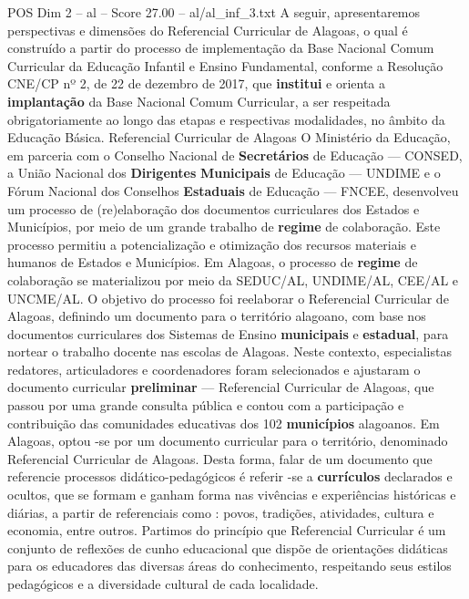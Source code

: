 \begin{textsample}{POS Dim 2 – al – Score 27.00 – al/al\_inf\_3.txt}  \label{ex:f2_pos_262}
A seguir, apresentaremos perspectivas e dimensões do Referencial Curricular de Alagoas, o qual é construído a partir do processo de implementação da Base Nacional Comum Curricular da Educação Infantil e Ensino Fundamental, conforme a Resolução CNE/CP nº 2, de 22 de dezembro de 2017, que \textbf{institui} e orienta a \textbf{implantação} da Base Nacional Comum Curricular, a ser respeitada obrigatoriamente ao longo das etapas e respectivas modalidades, no âmbito da Educação Básica.
Referencial Curricular de Alagoas O Ministério da Educação, em parceria com o Conselho Nacional de \textbf{Secretários} de Educação — CONSED, a União Nacional dos \textbf{Dirigentes} \textbf{Municipais} de Educação — UNDIME e o Fórum Nacional dos Conselhos \textbf{Estaduais} de Educação — FNCEE, desenvolveu um processo de (re)elaboração dos documentos curriculares dos Estados e Municípios, por meio de um grande trabalho de \textbf{regime} de colaboração.
Este processo permitiu a potencialização e otimização dos recursos materiais e humanos de Estados e Municípios.
Em Alagoas, o processo de \textbf{regime} de colaboração se materializou por meio da SEDUC/AL, UNDIME/AL, CEE/AL e UNCME/AL.
O objetivo do processo foi reelaborar o Referencial Curricular de Alagoas, definindo um documento para o território alagoano, com base nos documentos curriculares dos Sistemas de Ensino \textbf{municipais} e \textbf{estadual}, para nortear o trabalho docente nas escolas de Alagoas.
Neste contexto, especialistas redatores, articuladores e coordenadores foram selecionados e ajustaram o documento curricular \textbf{preliminar} — Referencial Curricular de Alagoas, que passou por uma grande consulta pública e contou com a participação e contribuição das comunidades educativas dos 102 \textbf{municípios} alagoanos.
Em Alagoas, optou -se por um documento curricular para o território, denominado Referencial Curricular de Alagoas.
Desta forma, falar de um documento que referencie processos didático-pedagógicos é referir -se a \textbf{currículos} declarados e ocultos, que se formam e ganham forma nas vivências e experiências históricas e diárias, a partir de referenciais como : povos, tradições, atividades, cultura e economia, entre outros.
Partimos do princípio que Referencial Curricular é um conjunto de reflexões de cunho educacional que dispõe de orientações didáticas para os educadores das diversas áreas do conhecimento, respeitando seus estilos pedagógicos e a diversidade cultural de cada localidade.

\end{textsample}
